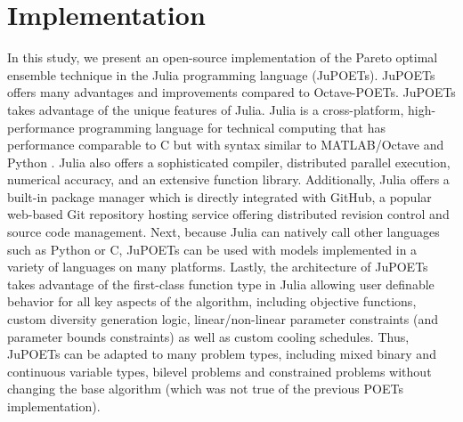 \documentclass{bmcart}
\begin{document}
\section*{Implementation}
In this study, we present an open-source implementation of the Pareto optimal ensemble technique in the Julia programming language (JuPOETs).
JuPOETs offers many advantages and improvements compared to Octave-POETs.
JuPOETs takes advantage of the unique features of Julia.
Julia is a cross-platform, high-performance programming language for technical computing that has performance comparable to C but with syntax similar to MATLAB/Octave and Python \cite{Julia}. Julia also offers a sophisticated compiler, distributed parallel execution, numerical accuracy, and an extensive function library.
Additionally, Julia offers a built-in package manager which is directly integrated with GitHub,
a popular web-based Git repository hosting service offering distributed revision control and source code management.
Next, because Julia can natively call other languages such as Python or C, JuPOETs can be used with models implemented in a variety of languages on many platforms.
Lastly, the architecture of JuPOETs takes advantage of the first-class function type in Julia allowing user definable behavior for all key aspects of the algorithm, including objective functions, custom diversity generation logic, linear/non-linear parameter constraints (and parameter bounds constraints) as well as custom cooling schedules.
Thus, JuPOETs can be adapted to many problem types, including mixed binary and continuous variable types, bilevel problems and constrained problems without changing the base algorithm (which was not true of the previous POETs implementation).
\end{document}
